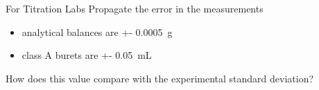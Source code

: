 \documentclass[notes=hide]{beamer}
\begin{document}


\begin{frame}[t]{For Titration Labs}
	Propagate the error in the measurements
		\begin{itemize}
			\item analytical balances are \SI{+-
				0.0005}{\gram}
			\item class A burets are \SI{+-
				0.05}{\milli\liter}
		\end{itemize}

	How does this value compare with the experimental standard
			deviation?
\end{frame}
\end{document}
